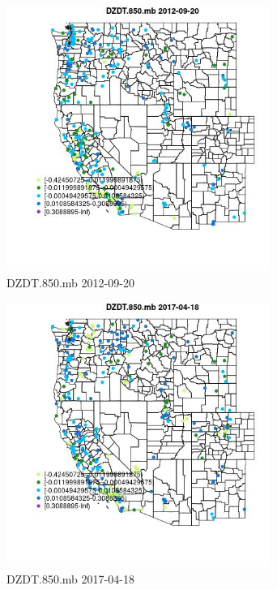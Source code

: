\begin{figure} 
\centering  
\includegraphics[width=0.77\textwidth]{Code_Outputs/Report_ML_input_PM25_Step4_part_e_de_duplicated_aves_compiled_2019-05-14wNAs_MapObsDZDT850mb2012-09-20.jpg} 
\caption{\label{fig:Report_ML_input_PM25_Step4_part_e_de_duplicated_aves_compiled_2019-05-14wNAsMapObsDZDT850mb2012-09-20}DZDT.850.mb 2012-09-20} 
\end{figure} 
 

\begin{figure} 
\centering  
\includegraphics[width=0.77\textwidth]{Code_Outputs/Report_ML_input_PM25_Step4_part_e_de_duplicated_aves_compiled_2019-05-14wNAs_MapObsDZDT850mb2017-04-18.jpg} 
\caption{\label{fig:Report_ML_input_PM25_Step4_part_e_de_duplicated_aves_compiled_2019-05-14wNAsMapObsDZDT850mb2017-04-18}DZDT.850.mb 2017-04-18} 
\end{figure} 
 

